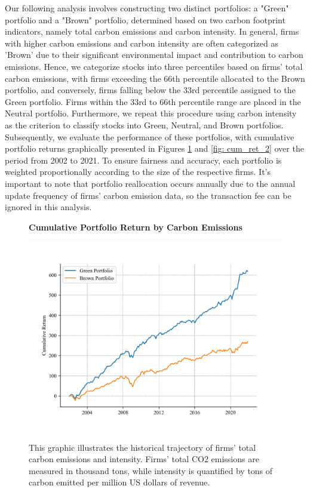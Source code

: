 \documentclass[12pt]{article}
\begin{document}
Our following analysis involves constructing two distinct portfolios: a "Green" portfolio and a "Brown" portfolio, determined based on two carbon footprint indicators, namely total carbon emissions and carbon intensity. In general, firms with higher carbon emissions and carbon intensity are often categorized as 'Brown' due to their significant environmental impact and contribution to carbon emissions. Hence, we categorize stocks into three percentiles based on firms' total carbon emissions, with firms exceeding the 66th percentile allocated to the Brown portfolio, and conversely, firms falling below the 33rd percentile assigned to the Green portfolio. Firms within the 33rd to 66th percentile range are placed in the Neutral portfolio. Furthermore, we repeat this procedure using carbon intensity as the criterion to classify stocks into Green, Neutral, and Brown portfolios. Subsequently, we evaluate the performance of these portfolios, with cumulative portfolio returns graphically presented in Figures \ref{fig: cum_ret_1} and \ref{fig: cum_ret_2} over the period from 2002 to 2021. To ensure fairness and accuracy, each portfolio is weighted proportionally according to the size of the respective firms. It's important to note that portfolio reallocation occurs annually due to the annual update frequency of firms' carbon emission data, so the transaction fee can be ignored in this analysis.

\begin{figure}[!ht]
\centering
\caption{\textbf{Cumulative Portfolio Return by Carbon Emissions}}
\includegraphics{graphics/green_brown_co2.png}
\label{fig: cum_ret_1}
\caption*{\footnotesize{This graphic illustrates the historical trajectory of firms' total carbon emissions and intensity. Firms' total CO2 emissions are measured in thousand tons, while intensity is quantified by tons of carbon emitted per million US dollars of revenue.}}
\end{figure}
\end{document}
